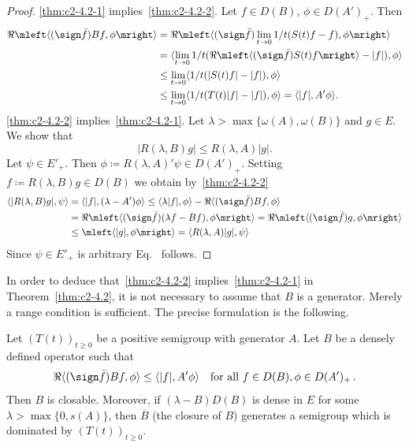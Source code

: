 \begin{proof}
\ref{thm:c2-4.2-1}   implies~\ref{thm:c2-4.2-2}. Let $f \in D(B)$, $\phi \in D(A')_{+}$. Then
\begin{align*}
\Re\mleft\langle(\sign  \bar{f})Bf, \phi\mright\rangle &= 
\Re \mleft\langle(\sign  \bar{f})\lim_{t \to 0}1/t(S(t)f - f),\phi\mright\rangle\\
&= \langle\lim_{t \to 0}1/t(\Re\mleft\langle(\sign  \bar{f}) S(t)f\mright\rangle - |f|),\phi\rangle\\
&\leq \lim_{t \to 0}\langle 1/t(|S(t)f| - |f|),\phi\rangle\\
&\leq \lim_{t \to 0}\langle 1/t(T(t)|f| - |f|),\phi\rangle = \langle|f|,A'\phi\rangle.
\end{align*}
\ref{thm:c2-4.2-2}   implies~\ref{thm:c2-4.2-1}. 
Let $\lambda > \max\{\omega (A),\omega (B)\}$ and $g \in E$. 
We show that
\begin{equation}\label{eq:c2-4.3}
|R(\lambda,B)g| \leq R(\lambda,A)|g|.
\end{equation}
Let $\psi \in E'_{+}$. Then $\phi \coloneq R(\lambda,A)'\psi \in D(A')_{+}$.
Setting $f \coloneq R(\lambda,B)g \in D(B)$ we obtain by~\ref{thm:c2-4.2-2}  
\begin{align*}
\langle|R(\lambda,B)g|,\psi\rangle &= \langle|f|,(\lambda-A')\phi\rangle \leq \langle\lambda|f|,\phi\rangle - \Re\langle(\sign  \bar{f})Bf,\phi\rangle\\
&= \Re\mleft\langle(\sign  \bar{f})(\lambda f - Bf),\phi\mright\rangle 
= \Re\mleft\langle(\sign  \bar{f})g,\phi\mright\rangle \\
&\leq \mleft\langle|g|,\phi\mright\rangle = \langle R(\lambda,A)|g|,\psi\rangle
\end{align*}
Since $\psi \in E'_{+}$ is arbitrary Eq.~ follows.
\end{proof}
In order to deduce that~\ref{thm:c2-4.2-2}   implies~\ref{thm:c2-4.2-1}   in Theorem~\ref{thm:c2-4.2}, it is not
necessary to assume that $B$ is a generator. 
Merely a range condition is sufficient. 
The precise formulation is the following.
\begin{theorem}\label{thm:c2-4.3}
Let $(T(t))_{t \geq 0}$ be a positive semigroup with generator $A$. 
Let $B$ be a densely defined operator such that
\begin{equation}\label{eq:c2-4.4}
\Re\langle(\sign  \bar{f})Bf,\phi\rangle \leq \langle|f|,A'\phi\rangle
\quad\text{for all } f \in D(B), \phi \in D(A')_{+}\,.
\end{equation}
Then $B$ is closable. 
Moreover, if\/ $(\lambda - B)D(B)$ is dense in $E$ for some $\lambda > \max\{0,s(A)\}$, then $\overline{B}$ (the closure of\/ $B$) generates a
semigroup which is dominated by $(T(t))_{t \geq 0}$.
\end{theorem}
